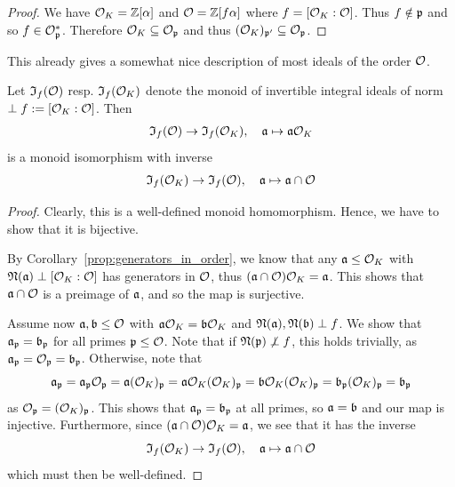 \begin{proof}
    We have $\O_K = \Z[\alpha]$ and $\O = \Z[f\alpha]$ where $f = [\O_K : \O]$.
    Thus $f \notin \p$ and so $f \in \O_\p^*$.
    Therefore $\O_K \subseteq \O_\p$ and thus $(\O_K)_{\p'} \subseteq \O_\p$.
\end{proof}
This already gives a somewhat nice description of most ideals of the order $\O$.
\begin{prop}
    \label{prop:coprime_ideals_order}
    Let $\mathfrak{I}_f(\O)$ resp. $\mathfrak{I}_f(\O_K)$ denote the monoid of invertible integral ideals of norm $\perp f := [\O_K : \O]$.
    Then
    \begin{align*}
        \mathfrak{I}_f(\O) \to \mathfrak{I}_f(\O_K), \quad \a \mapsto \a\O_K
    \end{align*}
    is a monoid isomorphism with inverse
    \begin{equation*}
        \mathfrak{I}_f(\O_K) \to \mathfrak{I}_f(\O), \quad \a \mapsto \a \cap \O
    \end{equation*}
\end{prop}
\begin{proof}
    Clearly, this is a well-defined monoid homomorphism.
    Hence, we have to show that it is bijective.

    By Corollary~\ref{prop:generators_in_order}, we know that any $\a \leq \O_K$ with $\Norm(\a) \perp [\O_K : \O]$ has generators in $\O$, thus $(\a \cap \O)\O_K = \a$.
    This shows that $\a \cap \O$ is a preimage of $\a$, and so the map is surjective. 

    Assume now $\a, \b \leq \O$ with $\a\O_K = \b\O_K$ and $\Norm(\a), \Norm(\b) \perp f$.
    We show that $\a_\p = \b_\p$ for all primes $\p \leq \O$.
    Note that if $\Norm(\p) \not\perp f$, this holds trivially, as $\a_\p = \O_\p = \b_\p$.
    Otherwise, note that
    \begin{equation*}
        \a_\p = \a_\p \O_\p = \a (\O_K)_\p = \a\O_K(\O_K)_\p = \b\O_K(\O_K)_\p = \b_\p (\O_K)_\p = \b_\p
    \end{equation*}
    as $\O_\p = (\O_K)_\p$.
    This shows that $\a_\p = \b_\p$ at all primes, so $\a = \b$ and our map is injective.
    Furthermore, since $(\a \cap \O)\O_K = \a$, we see that it has the inverse
    \begin{equation*}
        \mathfrak{I}_f(\O_K) \to \mathfrak{I}_f(\O), \quad \a \mapsto \a \cap \O
    \end{equation*}
    which must then be well-defined.
\end{proof}
